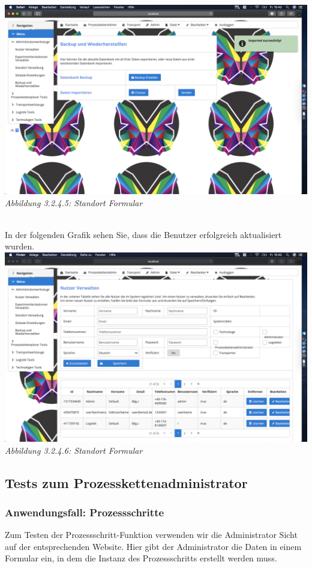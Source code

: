 \documentclass[enabledeprecatedfontcommands,fontsize=12pt,paper=a4,twoside]{scrartcl}
\begin{document}
\hypertarget{sc3.1.5.5}{
\includegraphics[width=1\textwidth]{Screenshots/5BackImported.png}
\textit{Abbildung 3.2.4.5: Standort Formular}
} \\
In der folgenden Grafik sehen Sie, dass die Benutzer erfolgreich aktualisiert wurden.\\

\hypertarget{sc3.1.5.6}{
\includegraphics[width=1\textwidth]{Screenshots/5AddUsers.png}
\textit{Abbildung 3.2.4.6: Standort Formular}
} \\


\subsection{Tests zum Prozesskettenadministrator}

\subsubsection{Anwendungsfall: Prozessschritte}
Zum Testen der Prozessschritt-Funktion verwenden wir die Administrator Sicht auf der entsprechenden Website. Hier gibt der Administrator die Daten in einem Formular ein, in dem die Instanz des Prozessschritts erstellt werden muss.\\
\end{document}
